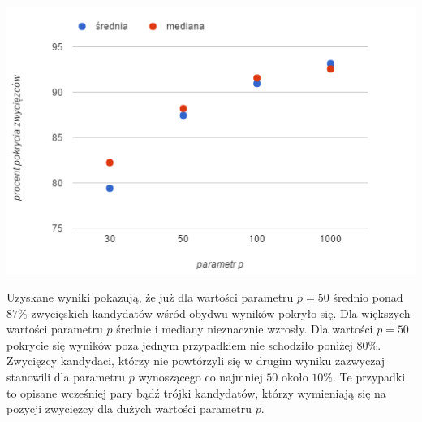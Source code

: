 \documentclass[pdflatex,11pt]{../aghdoc_version2}
\begin{document}
\vspace{\baselineskip}

\begin{center}
\centerline{\includegraphics[scale=1]{pics/srednia_mediana_od_parametr_p.png}}
\end{center}

Uzyskane wyniki pokazują, że już dla wartości parametru $p = 50$ średnio ponad $87 \%$ zwycięskich kandydatów wśród obydwu wyników pokryło się. Dla większych wartości parametru $p$ średnie i mediany nieznacznie wzrosły. Dla wartości $p = 50$ pokrycie się wyników poza jednym przypadkiem nie schodziło poniżej $80 \%$. Zwycięzcy kandydaci, którzy nie powtórzyli się w drugim wyniku zazwyczaj stanowili dla parametru $p$ wynoszącego co najmniej $50$ około $10 \%$. Te przypadki to opisane wcześniej pary bądź trójki kandydatów, którzy wymieniają się na pozycji zwycięzcy dla dużych wartości parametru $p$. 





\end{document}
